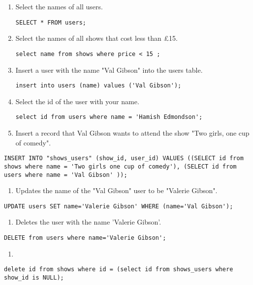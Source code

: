 \documentclass[11pt]{article}
\begin{document}
\begin{enumerate}
\item Select the names of all users.
\begin{verbatim}
SELECT * FROM users;
\end{verbatim}

\item Select the names of all shows that cost less than £15.
\begin{verbatim}
select name from shows where price < 15 ;
\end{verbatim}
\item Insert a user with the name "Val Gibson" into the users table.
\begin{verbatim}
insert into users (name) values ('Val Gibson');
\end{verbatim}
\item Select the id of the user with your name.
\begin{verbatim}
select id from users where name = 'Hamish Edmondson';
\end{verbatim}
\item Insert a record that Val Gibson wants to attend the show "Two girls,
one cup of comedy".
\end{enumerate}
\begin{verbatim}
INSERT INTO "shows_users" (show_id, user_id) VALUES ((SELECT id from shows where name = 'Two girls one cup of comedy'), (SELECT id from users where name = 'Val Gibson' ));
\end{verbatim}
\begin{enumerate}
\item Updates the name of the "Val Gibson" user to be "Valerie Gibson".
\end{enumerate}
\begin{verbatim}
UPDATE users SET name='Valerie Gibson' WHERE (name='Val Gibson');
\end{verbatim}
\begin{enumerate}
\item Deletes the user with the name 'Valerie Gibson'.
\end{enumerate}
\begin{verbatim}
DELETE from users where name='Valerie Gibson';
\end{verbatim}
\begin{enumerate}
\item 
\end{enumerate}
\begin{verbatim}
delete id from shows where id = (select id from shows_users where show_id is NULL);
\end{verbatim}
\end{document}
